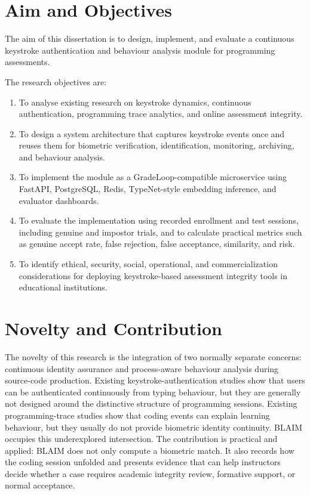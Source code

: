 \section{Aim and Objectives}
\label{sec:aim-objectives}

The aim of this dissertation is to design, implement, and evaluate a continuous keystroke authentication and behaviour analysis module for programming assessments.

The research objectives are:

\begin{enumerate}
  \item To analyse existing research on keystroke dynamics, continuous authentication, programming trace analytics, and online assessment integrity.
  \item To design a system architecture that captures keystroke events once and reuses them for biometric verification, identification, monitoring, archiving, and behaviour analysis.
  \item To implement the module as a GradeLoop-compatible microservice using FastAPI, PostgreSQL, Redis, TypeNet-style embedding inference, and evaluator dashboards.
  \item To evaluate the implementation using recorded enrollment and test sessions, including genuine and impostor trials, and to calculate practical metrics such as genuine accept rate, false rejection, false acceptance, similarity, and risk.
  \item To identify ethical, security, social, operational, and commercialization considerations for deploying keystroke-based assessment integrity tools in educational institutions.
\end{enumerate}

\section{Novelty and Contribution}
\label{sec:novelty}

The novelty of this research is the integration of two normally separate concerns: continuous identity assurance and process-aware behaviour analysis during source-code production. Existing keystroke-authentication studies show that users can be authenticated continuously from typing behaviour, but they are generally not designed around the distinctive structure of programming sessions. Existing programming-trace studies show that coding events can explain learning behaviour, but they usually do not provide biometric identity continuity. BLAIM occupies this underexplored intersection. The contribution is practical and applied: BLAIM does not only compute a biometric match. It also records how the coding session unfolded and presents evidence that can help instructors decide whether a case requires academic integrity review, formative support, or normal acceptance.

